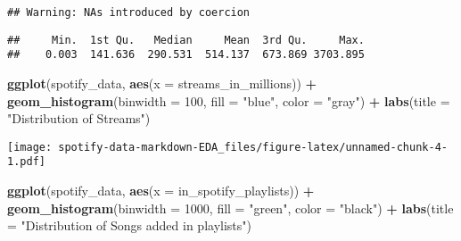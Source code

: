 \documentclass[
]{article}
\newenvironment{Shaded}{\begin{snugshade}}{\end{snugshade}}
\newcommand{\AttributeTok}[1]{\textcolor[rgb]{0.13,0.29,0.53}{#1}}
\newcommand{\DecValTok}[1]{\textcolor[rgb]{0.00,0.00,0.81}{#1}}
\newcommand{\FunctionTok}[1]{\textcolor[rgb]{0.13,0.29,0.53}{\textbf{#1}}}
\newcommand{\NormalTok}[1]{#1}
\newcommand{\OtherTok}[1]{\textcolor[rgb]{0.56,0.35,0.01}{#1}}
\newcommand{\SpecialCharTok}[1]{\textcolor[rgb]{0.81,0.36,0.00}{\textbf{#1}}}
\newcommand{\StringTok}[1]{\textcolor[rgb]{0.31,0.60,0.02}{#1}}
\begin{document}
\begin{verbatim}
## Warning: NAs introduced by coercion
\end{verbatim}

\begin{Shaded}
\end{Shaded}

\begin{verbatim}
##     Min.  1st Qu.   Median     Mean  3rd Qu.     Max. 
##    0.003  141.636  290.531  514.137  673.869 3703.895
\end{verbatim}

\begin{Shaded}
\begin{Highlighting}[]
\FunctionTok{ggplot}\NormalTok{(spotify\_data, }\FunctionTok{aes}\NormalTok{(}\AttributeTok{x =}\NormalTok{ streams\_in\_millions)) }\SpecialCharTok{+}
  \FunctionTok{geom\_histogram}\NormalTok{(}\AttributeTok{binwidth =} \DecValTok{100}\NormalTok{, }\AttributeTok{fill =} \StringTok{"blue"}\NormalTok{, }\AttributeTok{color =} \StringTok{"gray"}\NormalTok{) }\SpecialCharTok{+}
  \FunctionTok{labs}\NormalTok{(}\AttributeTok{title =} \StringTok{"Distribution of Streams"}\NormalTok{)}
\end{Highlighting}
\end{Shaded}

\texttt{[image: spotify-data-markdown-EDA\_files/figure-latex/unnamed-chunk-4-1.pdf]}

\begin{Shaded}
\begin{Highlighting}[]
\FunctionTok{ggplot}\NormalTok{(spotify\_data, }\FunctionTok{aes}\NormalTok{(}\AttributeTok{x =}\NormalTok{ in\_spotify\_playlists)) }\SpecialCharTok{+}
  \FunctionTok{geom\_histogram}\NormalTok{(}\AttributeTok{binwidth =} \DecValTok{1000}\NormalTok{, }\AttributeTok{fill =} \StringTok{"green"}\NormalTok{, }\AttributeTok{color =} \StringTok{"black"}\NormalTok{) }\SpecialCharTok{+}
  \FunctionTok{labs}\NormalTok{(}\AttributeTok{title =} \StringTok{"Distribution of Songs added in playlists"}\NormalTok{)}
\end{Highlighting}
\end{Shaded}
\end{document}
